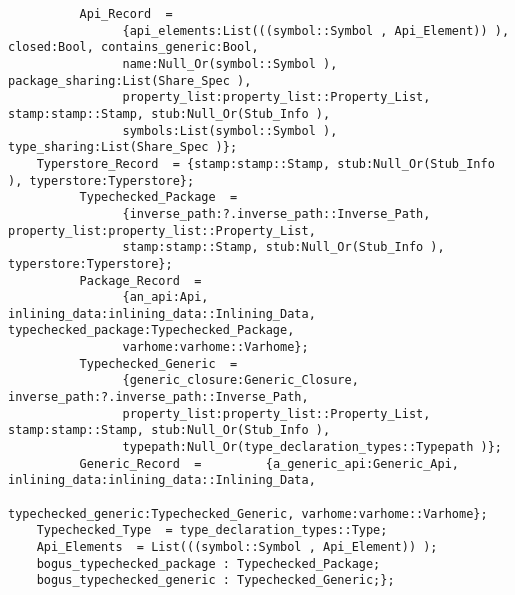 \begin{verbatim}
          Api_Record  =
                {api_elements:List(((symbol::Symbol , Api_Element)) ), closed:Bool, contains_generic:Bool,
                name:Null_Or(symbol::Symbol ), package_sharing:List(Share_Spec ),
                property_list:property_list::Property_List, stamp:stamp::Stamp, stub:Null_Or(Stub_Info ),
                symbols:List(symbol::Symbol ), type_sharing:List(Share_Spec )};
    Typerstore_Record  = {stamp:stamp::Stamp, stub:Null_Or(Stub_Info ), typerstore:Typerstore};
          Typechecked_Package  =
                {inverse_path:?.inverse_path::Inverse_Path, property_list:property_list::Property_List,
                stamp:stamp::Stamp, stub:Null_Or(Stub_Info ), typerstore:Typerstore};
          Package_Record  =
                {an_api:Api, inlining_data:inlining_data::Inlining_Data, typechecked_package:Typechecked_Package,
                varhome:varhome::Varhome};
          Typechecked_Generic  =
                {generic_closure:Generic_Closure, inverse_path:?.inverse_path::Inverse_Path,
                property_list:property_list::Property_List, stamp:stamp::Stamp, stub:Null_Or(Stub_Info ),
                typepath:Null_Or(type_declaration_types::Typepath )};
          Generic_Record  =         {a_generic_api:Generic_Api, inlining_data:inlining_data::Inlining_Data,
                                    typechecked_generic:Typechecked_Generic, varhome:varhome::Varhome};
    Typechecked_Type  = type_declaration_types::Type;
    Api_Elements  = List(((symbol::Symbol , Api_Element)) );
    bogus_typechecked_package : Typechecked_Package;
    bogus_typechecked_generic : Typechecked_Generic;};
\end{verbatim}
